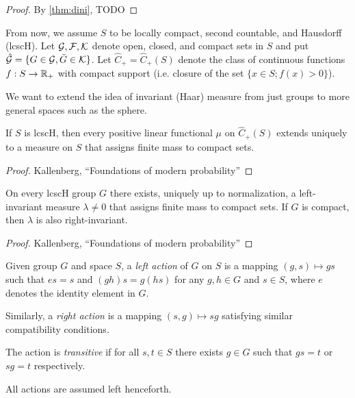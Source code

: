 \begin{proof}
  By \cref{thm:dini}, TODO
\end{proof}

From now, we assume $S$ to be locally compact, second countable, and Hausdorff
(lcscH). Let $\mathcal{G}, \mathcal{F}, \mathcal{K}$ denote open, closed, and compact sets in
$S$
and put $\hat{\mathcal{G}} = \{ G \in \mathcal{G}, \bar{G} \in \mathcal{K}\}$.
Let $\hat{C}_+ = \hat{C}_+(S)$ denote the class of continuous functions
$f : S \to \mathbb{R}_+$ with compact support (i.e.
closure of the set $\{x \in S; f(x) > 0\}$).

We want to extend the idea of invariant (Haar) measure from just groups
to more general spaces such as the sphere.

\begin{theorem}
  \label{thm:riesz-extend-fts-to-meas}
  If $S$ is lcscH, then every positive linear functional $\mu$
  on $\hat{C}_+(S)$ extends uniquely to a measure on $S$ that assigns
  finite mass to compact sets.
\end{theorem}

\begin{proof}
  Kallenberg, ``Foundations of modern probability''
\end{proof}

\begin{theorem}
  On every lcscH group $G$ there exists, uniquely up to normalization,
  a left-invariant measure $\lambda \neq 0$ that assigns finite mass to
  compact sets.
  If $G$ is compact, then $\lambda$ is also right-invariant.
\end{theorem}

\begin{proof}
  Kallenberg, ``Foundations of modern probability''
\end{proof}

\begin{definition}
  Given group $G$ and space $S$, a \emph{left action}
  of $G$ on $S$ is a mapping $(g,s) \mapsto gs$ such that $es = s$
  and $(gh)s = g (hs)$ for any $g,h \in G$ and $s \in S$,
  where $e$ denotes the identity element in $G$.

  Similarly, a \emph{right action} is a mapping $(s,g) \mapsto s g$
  satisfying similar compatibility conditions.

  The action is \emph{transitive} if for all $s,t \in S$ there
  exists $g \in G$ such that $g s = t$ or $s g = t$ respectively.

  All actions are assumed left henceforth.
\end{definition}

